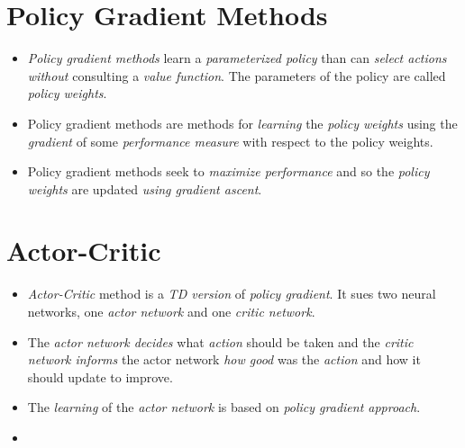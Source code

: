 \documentclass[
	number={11},
	title={Reinforcement Learning}
]{cs584notes}
\begin{document}
\section{Policy Gradient Methods}\label{sec:policy-gradient-methods}
\begin{itemize}
	\item \emph{Policy gradient methods} learn a \emph{parameterized policy} than can \emph{select actions without} consulting a \emph{value function}.
	The parameters of the policy are called \emph{policy weights}.
	\item Policy gradient methods are methods for \emph{learning} the \emph{policy weights} using the \emph{gradient} of some \emph{performance measure} with respect to the policy weights.
	\item Policy gradient methods seek to \emph{maximize performance} and so the \emph{policy weights} are updated \emph{using gradient ascent}.
\end{itemize}

\section{Actor-Critic}\label{sec:actor-critic}
\begin{itemize}
	\item \emph{Actor-Critic} method is a \emph{TD version} of \emph{policy gradient}.
	It sues two neural networks, one \emph{actor network} and one \emph{critic network}.
	\item The \emph{actor network decides} what \emph{action} should be taken and the \emph{critic network informs} the actor network \emph{how good} was the \emph{action} and how it should update to improve.
	\item The \emph{learning} of the \emph{actor network} is based on \emph{policy gradient approach}.
	\item
\end{itemize}
\end{document}
